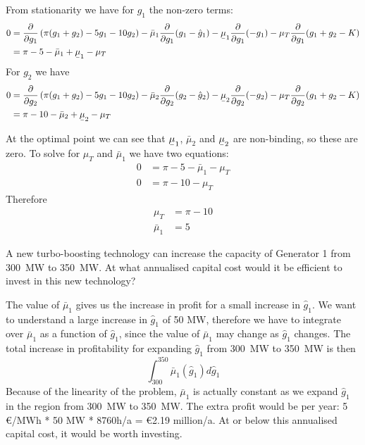 \documentclass[11pt,a4paper,fleqn]{scrartcl}
\def\m{\mu}
\def\d{\partial}
\def\nn{\nonumber}
\newcommand{\ubar}[1]{\text{\b{$#1$}}}
\begin{document}
\begin{enumerate}[(a)]
 From stationarity we have for $g_1$ the non-zero terms:
 \begin{align*}
  0 & =   \frac{\d}{\d g_1} \left( \pi (g_1+g_2) - 5g_1 - 10g_2\right) - \bar{\m}_1 \frac{\d}{\d g_1} (g_1-\hat g_1)- \ubar{\m}_1 \frac{\d}{\d g_1} (-g_1) -\m_T \frac{\d}{\d g_1} (g_1+g_2-K)  \nn \\
    & = \pi -5 - \bar{\m}_1 + \ubar{\m}_1 - \m_T
 \end{align*}
 For $g_2$ we have
 \begin{align*}
  0 & =   \frac{\d}{\d g_2} \left( \pi (g_1+g_2) - 5g_1 - 10g_2\right) - \bar{\m}_2 \frac{\d}{\d g_2} (g_2-\hat g_2)- \ubar{\m}_2 \frac{\d}{\d g_2} (-g_2) -\m_T \frac{\d}{\d g_2} (g_1+g_2-K)  \nn \\
    & = \pi - 10- \bar{\m}_2 + \ubar{\m}_2 - \m_T
 \end{align*}

 At the optimal point we can see that $\ubar{\m}_1$, $\bar{\m}_2$ and $\ubar{\m}_2$ are non-binding, so these are zero. To solve for $\m_T$ and $\bar{\m}_1$ we have two equations:
 \begin{align*}
  0 & = \pi - 5 - \bar{\m}_1 - \m_T \nn \\
  0 & = \pi - 10  - \m_T
 \end{align*}
 Therefore
 \begin{align*}
  \m_T       & = \pi - 10 \\
  \bar{\m}_1 & = 5
 \end{align*}

 \begin{shaded}\item A new turbo-boosting technology can increase the capacity of Generator 1 from 300~MW to 350~MW.  At what annualised capital cost would it be efficient to invest in this new technology?\end{shaded}

 The value of $\bar{\m}_1$ gives us the increase in profit for a small increase in $\hat{g}_1$. We want to understand a large increase in $\hat{g}_1$ of 50 MW, therefore we have to integrate over $\bar{\m}_1$ as a function of $\hat{g}_1$, since the value of $\bar{\m}_1$ may change as $\hat{g}_1$ changes. The total increase in profitability for expanding $\hat{g}_1$ from 300~MW to 350~MW is then
 \begin{equation*}
  \int_{300}^{350} \bar{\m}_1(\hat{g}_1) d\hat{g}_1
 \end{equation*}
 Because of the linearity of the problem,  $\bar{\m}_1$ is actually constant as we expand $\hat{g}_1$ in the region from 300~MW to 350~MW. The extra profit would be per year: 5 \euro/MWh * 50 MW * 8760h/a = \euro 2.19 million/a.
 At or below this annualised capital cost, it would be worth investing.


\end{enumerate}
\end{document}
